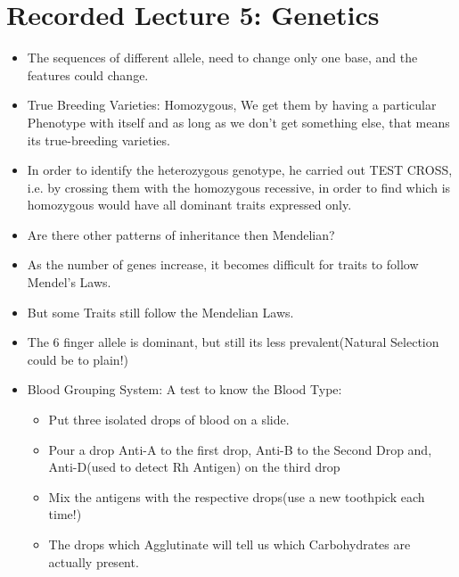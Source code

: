 \documentclass{article}
\begin{document}
\section{Recorded Lecture 5: Genetics}
\begin{itemize}
  \item The sequences of different allele, need to change only one base, and the features could change.
  \item True Breeding Varieties: Homozygous, We get them by having a particular Phenotype with itself and as long as we don't get something else, that means its true-breeding varieties.
  \item In order to identify the heterozygous genotype, he carried out TEST CROSS, i.e. by crossing them with the homozygous recessive, in order to find which is homozygous would have all dominant traits expressed only.
  \item Are there other patterns of inheritance then Mendelian?
  \item As the number of genes increase, it becomes difficult for traits to follow Mendel's Laws.
  \item But some Traits still follow the Mendelian Laws.
  \item The 6 finger allele is dominant, but still its less prevalent(Natural Selection could be to plain!)
  \item Blood Grouping System: A test to know the Blood Type:
  \begin{itemize}
    \item Put three isolated drops of blood on a slide.
    \item Pour a drop Anti-A to the first drop, Anti-B to the Second Drop and, Anti-D(used to detect Rh Antigen) on the third drop
    \item Mix the antigens with the respective drops(use a new toothpick each time!)
    \item The drops which Agglutinate will tell us which Carbohydrates are actually present.
  \end{itemize}
\end{itemize}
\end{document}
